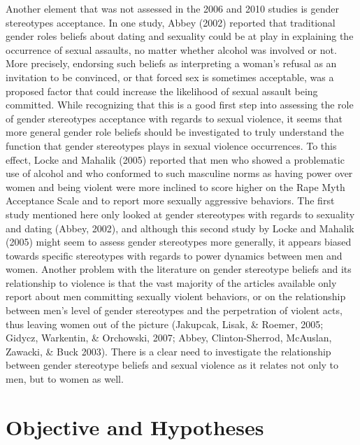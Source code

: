 \documentclass[authordate, serif, review]{jote-article}
\begin{document}
\begin{multicols}{2}
Another element that was not assessed in the 2006 and 2010 studies is gender stereotypes acceptance. In one study, Abbey (2002) reported that traditional gender roles beliefs about dating and sexuality could be at play in explaining the occurrence of sexual assaults, no matter whether alcohol was involved or not. More precisely, endorsing such beliefs as interpreting a woman's refusal as an invitation to be convinced, or that forced sex is sometimes acceptable, was a proposed factor that could increase the likelihood of sexual assault being committed. While recognizing that this is a good first step into assessing the role of gender stereotypes acceptance with regards to sexual violence, it seems that more general gender role beliefs should be investigated to truly understand the function that gender stereotypes plays in sexual violence occurrences. To this effect, Locke and Mahalik (2005) reported that men who showed a problematic use of alcohol and who conformed to such masculine norms as having power over women and being violent were more inclined to score higher on the Rape Myth Acceptance Scale and to report more sexually aggressive behaviors. The first study mentioned here only looked at gender stereotypes with regards to sexuality and dating (Abbey, 2002), and although this second study by Locke and Mahalik (2005) might seem to assess gender stereotypes more generally, it appears biased towards specific stereotypes with regards to power dynamics between men and women. Another problem with the literature on gender stereotype beliefs and its relationship to violence is that the vast majority of the articles available only report about men committing sexually violent behaviors, or on the relationship between men's level of gender stereotypes and the perpetration of violent acts, thus leaving women out of the picture (Jakupcak, Lisak, \& Roemer, 2005; Gidycz, Warkentin, \& Orchowski, 2007; Abbey, Clinton-Sherrod, McAuslan, Zawacki, \& Buck 2003). There is a clear need to investigate the relationship between gender stereotype beliefs and sexual violence as it relates not only to men, but to women as well.  

{}
\section*{Objective and Hypotheses}


\end{multicols}
\end{document}
